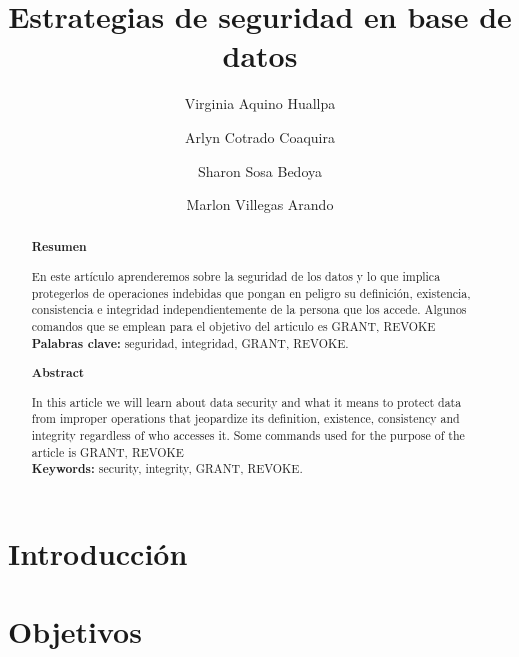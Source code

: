\documentclass[%
 reprint,
 amsmath,amssymb,
 aps,
]{revtex4-1}
\begin{document}
\title{Estrategias de seguridad en base de datos}
\author{Virginia Aquino Huallpa}
\author{Arlyn Cotrado Coaquira}
\author{Sharon Sosa Bedoya}
\author{Marlon Villegas Arando}
%

\begin{abstract}
\begin{center}
\textbf{Resumen}
\end{center}

En este artículo aprenderemos sobre la seguridad de los datos y lo que implica protegerlos de operaciones indebidas que pongan en peligro su definición, existencia, consistencia e integridad independientemente de la persona que los accede. Algunos comandos que se emplean para el objetivo del articulo es GRANT, REVOKE\\

\textbf{Palabras clave:}   seguridad, integridad, GRANT, REVOKE.\\

\begin{center}
\textbf{Abstract}
\end{center}
In this article we will learn about data security and what it means to protect data from improper operations that jeopardize its definition, existence, consistency and integrity regardless of who accesses it. Some commands used for the purpose of the article is GRANT, REVOKE\\
\textbf{Keywords:}   security, integrity, GRANT, REVOKE.\\

\end{abstract}



\maketitle


\section {Introducción}\label{sec:1}





\section{Objetivos}\label{sec:2}
\end{document}

